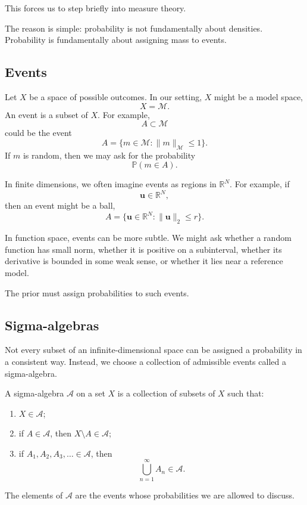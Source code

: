 \documentclass[11pt,a4paper]{book}
\newcommand{\M}{\mathcal{M}}      %
\newcommand{\R}{\mathbb{R}}
\begin{document}
This forces us to step briefly into measure theory.

The reason is simple: probability is not fundamentally about densities.
Probability is fundamentally about assigning mass to events.

\subsection{Events}

Let $X$ be a space of possible outcomes. In our setting, $X$ might be a model
space,
\[
    X = \M.
\]
An event is a subset of $X$. For example,
\[
    A \subset \M
\]
could be the event
\[
    A =
    \{m\in\M : \|m\|_{\M}\leq 1\}.
\]
If $m$ is random, then we may ask for the probability
\[
    \mathbb{P}(m\in A).
\]

In finite dimensions, we often imagine events as regions in $\R^N$. For
example, if
\[
    \bm{u}\in\R^N,
\]
then an event might be a ball,
\[
    A =
    \{\bm{u}\in\R^N : \|\bm{u}\|_2\leq r\}.
\]

In function space, events can be more subtle. We might ask whether a random
function has small norm, whether it is positive on a subinterval, whether its
derivative is bounded in some weak sense, or whether it lies near a reference
model.

The prior must assign probabilities to such events.

\subsection{Sigma-algebras}

Not every subset of an infinite-dimensional space can be assigned a probability
in a consistent way. Instead, we choose a collection of admissible events called
a sigma-algebra.

A sigma-algebra $\mathcal{A}$ on a set $X$ is a collection of subsets of $X$
such that:
\begin{enumerate}[label=\arabic*.]
    \item $X\in\mathcal{A}$;
    \item if $A\in\mathcal{A}$, then $X\setminus A\in\mathcal{A}$;
    \item if $A_1,A_2,A_3,\ldots\in\mathcal{A}$, then
    \[
        \bigcup_{n=1}^{\infty} A_n \in \mathcal{A}.
    \]
\end{enumerate}

The elements of $\mathcal{A}$ are the events whose probabilities we are allowed
to discuss.
\end{document}
